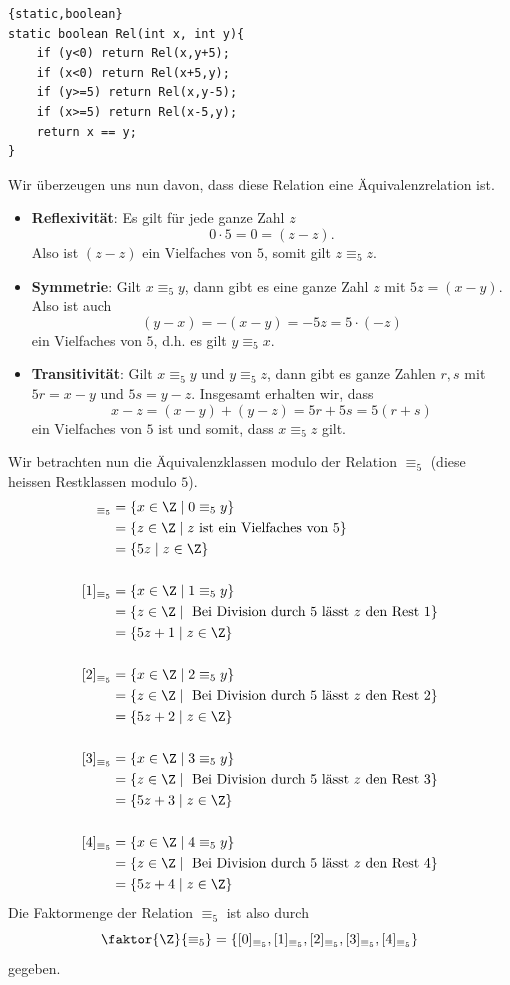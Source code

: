 \begin{bsp}
\begin{framed}
	\begin{lstlisting}{static,boolean}
static boolean Rel(int x, int y){
    if (y<0) return Rel(x,y+5);
    if (x<0) return Rel(x+5,y);
    if (y>=5) return Rel(x,y-5);
    if (x>=5) return Rel(x-5,y);
    return x == y;
}
\end{lstlisting}
\end{framed}
Wir überzeugen uns nun davon, dass diese Relation eine Äquivalenzrelation ist.
\begin{itemize}
\item \textbf{Reflexivität}: Es gilt für jede ganze Zahl $z$
\[
0\cdot 5=0=(z-z).
\]
Also ist $(z-z)$ ein Vielfaches von $5$, somit gilt $z\equiv_5 z$.
\item\textbf{Symmetrie}: Gilt $x\equiv_5 y$, dann gibt es eine ganze Zahl $z$ mit $5z=(x-y)$. Also ist auch
\[
(y-x)=-(x-y)=-5z=5\cdot(-z)
\]
ein Vielfaches von $5$, d.h. es gilt $y\equiv_5x$.
\item\textbf{Transitivität}: Gilt $x\equiv_5 y$ und $y\equiv_5 z$, dann gibt es ganze Zahlen $r,s$ mit $5r=x-y$ und $5s=y-z$. Insgesamt erhalten wir, dass
\[
x-z=(x-y)+(y-z)=5r+5s=5(r+s)
\]
ein Vielfaches von $5$ ist und somit, dass $x\equiv_5 z$ gilt.
\end{itemize}
Wir betrachten nun die Äquivalenzklassen modulo der Relation $\equiv_5$ (diese heissen Restklassen modulo $5$).
\begin{align*}
[0]_{\equiv_5}&=\{x\in \Z\mid 0\equiv_5y \}\\ &=\{z\in\Z\mid z\text{ ist ein Vielfaches von }5 \}\\
&=\{5z\mid z\in\Z \}\\
\phantom{dd}\\
[1]_{\equiv_5}&=\{x\in \Z\mid 1\equiv_5y \}\\ &=\{z\in\Z\mid \text{ Bei Division durch }5\text{ lässt }z\text{ den Rest }1 \}\\
&=\{5z+1\mid z\in\Z\}\\
\phantom{dd}\\
[2]_{\equiv_5}&=\{x\in \Z\mid 2\equiv_5y \}\\ &=\{z\in\Z\mid \text{ Bei Division durch }5\text{ lässt }z\text{ den Rest }2 \}\\
&=\{5z+2\mid z\in\Z\}\\
\phantom{dd}\\
[3]_{\equiv_5}&=\{x\in \Z\mid 3\equiv_5y \}\\ &=\{z\in\Z\mid \text{ Bei Division durch }5\text{ lässt }z\text{ den Rest }3 \}\\
&=\{5z+3\mid z\in\Z\}\\
\phantom{dd}\\
[4]_{\equiv_5}&=\{x\in \Z\mid 4\equiv_5y \}\\ &=\{z\in\Z\mid \text{ Bei Division durch }5\text{ lässt }z\text{ den Rest }4 \}\\
&=\{5z+4\mid z\in\Z\}
\end{align*}
Die Faktormenge der Relation $\equiv_5$ ist also durch
\[
\faktor{\Z}{\equiv_5}=\{ [0]_{\equiv_5},[1]_{\equiv_5},[2]_{\equiv_5},[3]_{\equiv_5},[4]_{\equiv_5} \}
\]
gegeben.
\end{bsp}
